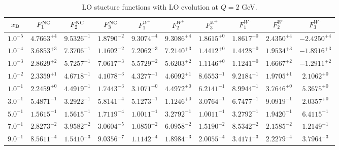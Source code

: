 \begin{table}[h]
\begin{adjustbox}{width=\textwidth}
\begin{tabular}{|c||c|c|c|c|c|c|c|c|c|}
\hline
$x_{\rm B}$ & $F_1^{\rm NC}$ & $F_2^{\rm NC}$ & $F_3^{\rm NC}$ & $F_1^{W^+}$ & $F_2^{W^+}$ & $F_3^{W^+}$ & $F_1^{W^-}$ & $F_2^{W^-}$ & $F_3^{W^-}$ \\
\hline
$ 1.0^{-5}$ & $ 4.7663^{+4}$ & $ 9.5326^{-1}$ & $ 1.8790^{-2}$ & $ 9.3074^{+4}$ & $ 9.3086^{+4}$ & $ 1.8615^{+0}$ & $ 1.8617^{+0}$ & $ 2.4350^{+4}$ & $-2.4250^{+4}$ \\
$ 1.0^{-4}$ & $ 3.6853^{+3}$ & $ 7.3706^{-1}$ & $ 1.1602^{-2}$ & $ 7.2062^{+3}$ & $ 7.2140^{+3}$ & $ 1.4412^{+0}$ & $ 1.4428^{+0}$ & $ 1.9534^{+3}$ & $-1.8916^{+3}$ \\
$ 1.0^{-3}$ & $ 2.8629^{+2}$ & $ 5.7257^{-1}$ & $ 7.0617^{-3}$ & $ 5.5729^{+2}$ & $ 5.6203^{+2}$ & $ 1.1146^{+0}$ & $ 1.1241^{+0}$ & $ 1.6667^{+2}$ & $-1.2911^{+2}$ \\
$ 1.0^{-2}$ & $ 2.3359^{+1}$ & $ 4.6718^{-1}$ & $ 4.1078^{-3}$ & $ 4.3277^{+1}$ & $ 4.6092^{+1}$ & $ 8.6553^{-1}$ & $ 9.2184^{-1}$ & $ 1.9705^{+1}$ & $ 2.1062^{+0}$ \\
$ 1.0^{-1}$ & $ 2.2459^{+0}$ & $ 4.4919^{-1}$ & $ 1.7443^{-3}$ & $ 3.1071^{+0}$ & $ 4.4972^{+0}$ & $ 6.2141^{-1}$ & $ 8.9944^{-1}$ & $ 3.7646^{+0}$ & $ 5.3675^{+0}$ \\
$ 3.0^{-1}$ & $ 5.4871^{-1}$ & $ 3.2922^{-1}$ & $ 5.8141^{-4}$ & $ 5.1273^{-1}$ & $ 1.1246^{+0}$ & $ 3.0764^{-1}$ & $ 6.7477^{-1}$ & $ 9.0919^{-1}$ & $ 2.0357^{+0}$ \\
$ 5.0^{-1}$ & $ 1.5615^{-1}$ & $ 1.5615^{-1}$ & $ 1.7119^{-4}$ & $ 1.0011^{-1}$ & $ 3.2792^{-1}$ & $ 1.0011^{-1}$ & $ 3.2792^{-1}$ & $ 1.9420^{-1}$ & $ 6.4115^{-1}$ \\
$ 7.0^{-1}$ & $ 2.8273^{-2}$ & $ 3.9582^{-2}$ & $ 3.0604^{-5}$ & $ 1.0850^{-2}$ & $ 6.0958^{-2}$ & $ 1.5190^{-2}$ & $ 8.5342^{-2}$ & $ 2.1585^{-2}$ & $ 1.2149^{-1}$ \\
$ 9.0^{-1}$ & $ 8.5611^{-4}$ & $ 1.5410^{-3}$ & $ 9.0356^{-7}$ & $ 1.1142^{-4}$ & $ 1.8984^{-3}$ & $ 2.0055^{-4}$ & $ 3.4171^{-3}$ & $ 2.2279^{-4}$ & $ 3.7964^{-3}$ \\
\hline
\end{tabular}
\end{adjustbox}\caption{LO stucture functions with LO evolution at $Q = 2$ GeV.}
\label{tab:N0LO-Q2}
\end{table}


